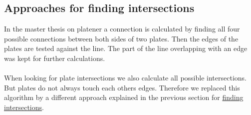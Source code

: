 \documentclass[../ClassicThesis.tex]{subfiles}
\begin{document}
\subsection{Approaches for finding intersections}
In the master thesis on platener\cite{master-thesis} a connection is calculated by finding all four possible connections between both sides of two plates. Then the edges of the plates are tested against the line. The part of the line overlapping with an edge was kept for further calculations.\\
\*\\
When looking for plate intersections we also calculate all possible intersections. But plates do not always touch each others edges. Therefore we replaced this algorithm by a different approach explained in the previous section for \hyperref[findIntersections]{finding intersections}.
\end{document}
